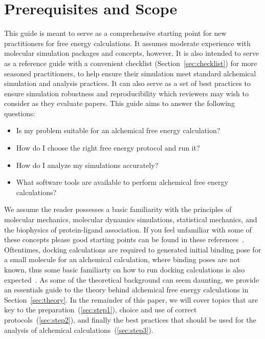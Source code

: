 \documentclass[9pt,bestpractices]{livecoms}
\begin{document}
\section{Prerequisites and Scope}
\label{sec:pre}
This guide is meant to serve as a comprehensive starting point for new practitioners for free energy calculations.  It assumes moderate experience with molecular simulation packages and concepts, however.  It is also intended to serve as a reference guide with a convenient checklist (Section~\ref{sec:checklist}) for more seasoned practitioners, to help ensure their simulation meet standard alchemical simulation and analysis practices. It can also serve as a set of best practices to ensure simulation robustness and reproducibility which reviewers may wish to consider as they evaluate papers.
%
This guide aims to answer the following questions:
\begin{itemize}
    \item Is my problem suitable for an alchemical free energy calculation? 
    \item How do I choose the right free energy protocol and run it? 
    \item How do I analyze my simulations accurately? 
    \item What software tools are available to perform alchemical free energy calculations? 
\end{itemize}
%
We assume the reader possesses a basic familiarity with the principles of molecular mechanics, molecular dynamics simulations, statistical mechanics, and the biophysics of protein-ligand association. If you feel unfamiliar with some of these concepts please good starting points can be found in these references~\cite{braun2019best, grossfield2018best, klimovich2015guidelines, shirts2012best}. Oftentimes, docking calculations are required to generated initial binding pose for a small molecule for an alchemical calculation, where binding poses are not known, thus some basic familiarty on how to run docking calculations is also expected~\cite{grinter2014challenges}. 
%
As some of the theoretical background can seem daunting, we provide an essentials guide to the theory behind alchemical free energy calculations in Section~\ref{sec:theory}.
In the remainder of this paper, we will cover topics that are key to the preparation~(\ref{sec:step1}), choice and use of correct protocols~(\ref{sec:step2}), and finally the best practices that should be used for the analysis of alchemical calculations~(\ref{sec:step3}). 
\end{document}
